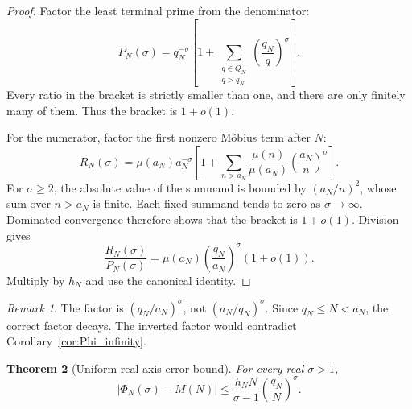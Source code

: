 \documentclass[11pt]{amsart}
\numberwithin{equation}{section}
\theoremstyle{plain}
\newtheorem{theorem}{Theorem}[section]
\theoremstyle{definition}
\theoremstyle{remark}
\newtheorem{remark}[theorem]{Remark}
\newcommand{\1}{\mathbf{1}}
\begin{document}
\begin{proof}
Factor the least terminal prime from the denominator:
\begin{equation}
P_N(\sigma)
=
q_N^{-\sigma}
\left[
1+
\sum_{\substack{q\in Q_N\\q>q_N}}
\left(\frac{q_N}{q}\right)^\sigma
\right].
\label{eq:leading_P_factorization}
\end{equation}
Every ratio in the bracket is strictly smaller than one, and there are only
finitely many of them.  Thus the bracket is \(1+o(1)\).

For the numerator, factor the first nonzero Möbius term after \(N\):
\begin{equation}
R_N(\sigma)
=
\mu(a_N)a_N^{-\sigma}
\left[
1+
\sum_{n>a_N}
\frac{\mu(n)}{\mu(a_N)}
\left(\frac{a_N}{n}\right)^\sigma
\right].
\label{eq:leading_R_factorization}
\end{equation}
For \(\sigma\geq2\), the absolute value of the summand is bounded by
\((a_N/n)^2\), whose sum over \(n>a_N\) is finite.  Each fixed summand
tends to zero as \(\sigma\to\infty\).  Dominated convergence therefore
shows that the bracket is \(1+o(1)\).  Division gives
\begin{equation}
\frac{R_N(\sigma)}{P_N(\sigma)}
=
\mu(a_N)
\left(\frac{q_N}{a_N}\right)^\sigma
(1+o(1)).
\label{eq:leading_ratio_detailed}
\end{equation}
Multiply by \(h_N\) and use the canonical identity.
\end{proof}

\begin{remark}
\label{rem:orientation_growth}
The factor is \((q_N/a_N)^\sigma\), not
\((a_N/q_N)^\sigma\).  Since \(q_N\leq N<a_N\), the correct factor
decays.  The inverted factor would contradict
Corollary~\ref{cor:Phi_infinity}.
\end{remark}

\begin{theorem}[Uniform real-axis error bound]
\label{thm:rounding_bound}
For every real \(\sigma>1\),
\begin{equation}
\boxed{
|\Phi_N(\sigma)-M(N)|
\leq
\frac{h_NN}{\sigma-1}
\left(\frac{q_N}{N}\right)^\sigma.
}
\label{eq:rounding_bound}
\end{equation}
\end{theorem}
\end{document}
